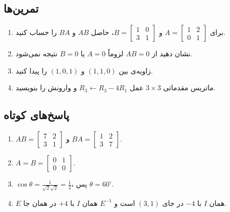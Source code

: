 \subsection*{تمرین‌ها}
\begin{enumerate}
  \item برای $A=\begin{bmatrix}1&2\\0&1\end{bmatrix}$ و $B=\begin{bmatrix}1&0\\3&1\end{bmatrix}$، حاصل $AB$ و $BA$ را حساب کنید.
  \item نشان دهید از $AB=0$ لزوماً $A=0$ یا $B=0$ نتیجه نمی‌شود.
  \item زاویه‌ی بین $(1,1,0)$ و $(1,0,1)$ را پیدا کنید.
  \item ماتریس مقدماتی $3\times3$ عمل $R_3\leftarrow R_3-4R_1$ و وارونش را بنویسید.
\end{enumerate}

\subsection*{پاسخ‌های کوتاه}
\begin{enumerate}
  \item $AB=\begin{bmatrix}7&2\\3&1\end{bmatrix}$ و $BA=\begin{bmatrix}1&2\\3&7\end{bmatrix}$.
  \item $A=B=\begin{bmatrix}0&1\\0&0\end{bmatrix}$.
  \item $\cos\theta=\frac{1}{\sqrt2\sqrt2}=\frac12$، پس $\theta=60^\circ$.
  \item $E$ همان $I$ با $-4$ در جای $(3,1)$ است و $E^{-1}$ همان $I$ با $+4$ در همان جا.
\end{enumerate}
